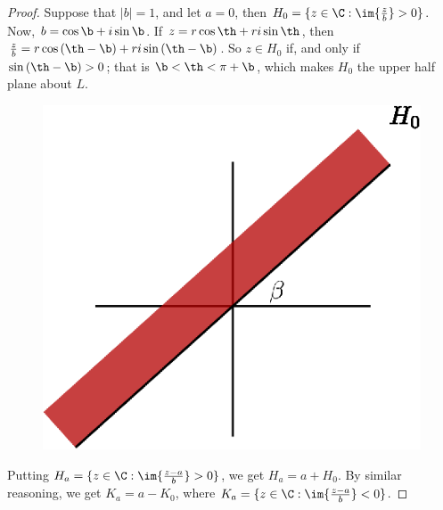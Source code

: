 \begin{proof}
    Suppose that $|b|=1$, and let  $a=0$, then  $H_0=\{z \in \C :
    \im{\frac{z}{b}} > 0\}$. Now, $b=\cos{\b}+i\sin{\b}$. If
    $z=r\cos{\th}+ri\sin{\th}$, then
    $\frac{z}{b}=r\cos{(\th-\b)}+ri\sin{(\th-\b)}$. So $z \in H_0$ if, and only
    if $\sin{(\th-\b)}>0$; that is $\b<\th<\pi+\b$, which makes  $H_0$ the upper
    half plane about $L$.
     \begin{figure}[h]
        \centering
        \includegraphics[scale=1]{Figures/Chapter1/H_0.eps}
        \caption{}
        \label{}
    \end{figure}

    Putting $H_a=\{z \in \C : \im{\frac{z-a}{b}}>0\}$, we get $H_a=a+H_0$. By
    similar reasoning, we get $K_a=a-K_0$, where $K_a=\{z \in \C :
    \im{\frac{z-a}{b}}<0\}$.
\end{proof}
